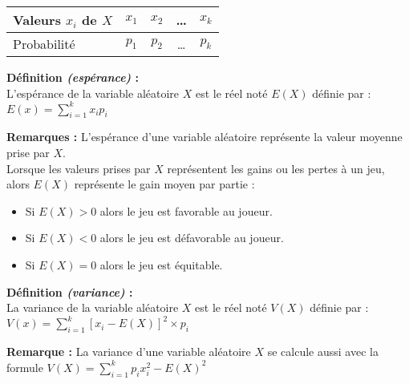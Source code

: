 \documentclass[11pt,a4paper]{article}
\begin{document}
\begin{center}
    \renewcommand{\arraystretch}{1.6}
    \begin{tabular}{|l|c|c|c|c|}
        \hline
        Valeurs $x_i$ de $X$ & $x_1$      & $x_2$      & \quad\text{ }\dots\quad\text{ } & $x_k$      \\
        \hline
        Probabilité      & $p_1$ & $p_2$ & \quad\text{ }\dots\quad\text{ } & $p_k$ \\
        \hline
    \end{tabular}
\end{center}
\vspace*{8pt}

\begin{mdframed}[style=definitionStyle]
    \textbf{Définition \emph{(espérance)} :} ~\\
    L'espérance de la variable aléatoire $X$ est le réel noté $E(X)$ définie par : \\
    $\displaystyle E(x)=\sum_{i=1}^{k}x_ip_i$          
\end{mdframed}

\textbf{Remarques :} L'espérance d'une variable aléatoire représente la valeur moyenne prise par $X$. \\

Lorsque les valeurs prises par $X$ représentent les gains ou les pertes à un jeu, alors $E(X)$ représente le gain moyen par partie :
\vspace*{-4pt}
\begin{itemize}
    \item Si $E(X)>0$ alors le jeu est favorable au joueur.
    \item Si $E(X)<0$ alors le jeu est défavorable au joueur.
    \item Si $E(X)=0$ alors le jeu est équitable.
\end{itemize}


\begin{mdframed}[style=definitionStyle]
    \textbf{Définition \emph{(variance)} :} ~\\
    La variance de la variable aléatoire $X$ est le réel noté $V(X)$ définie par : \\
    $\displaystyle V(x)=\sum_{i=1}^{k}\left[x_i-E(X)\right]^2\times p_i$
\end{mdframed}

\textbf{Remarque :} La variance d'une variable aléatoire $X$ se calcule aussi avec la formule $\displaystyle V(X)=\sum_{i=1}^{k} p_i x_i^2-E(X)^2$
\end{document}
